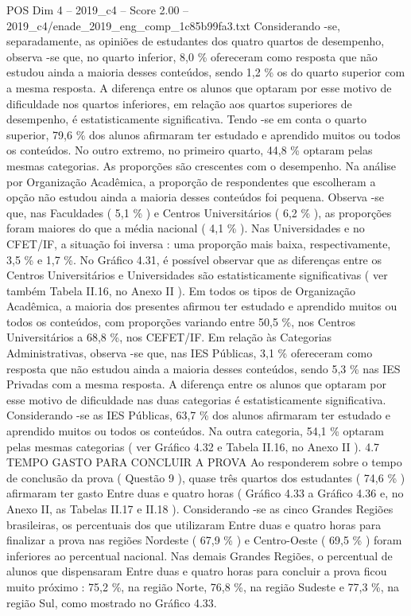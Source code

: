 \begin{textsample}{POS Dim 4 – 2019\_c4 – Score 2.00 – 2019\_c4/enade\_2019\_eng\_comp\_1c85b99fa3.txt}
Considerando -se, separadamente, as opiniões de estudantes dos quatro quartos de desempenho, observa -se que, no quarto inferior, 8,0 \% ofereceram como resposta que não estudou ainda a maioria desses conteúdos, sendo 1,2 \% os do quarto superior com a mesma resposta.
A diferença entre os alunos que optaram por esse motivo de dificuldade nos quartos inferiores, em relação aos quartos superiores de desempenho, é estatisticamente significativa.
Tendo -se em conta o quarto superior, 79,6 \% dos alunos afirmaram ter estudado e aprendido muitos ou todos os conteúdos.
No outro extremo, no primeiro quarto, 44,8 \% optaram pelas mesmas categorias.
As proporções são crescentes com o desempenho.
Na análise por Organização Acadêmica, a proporção de respondentes que escolheram a opção não estudou ainda a maioria desses conteúdos foi pequena.
Observa -se que, nas Faculdades ( 5,1 \% ) e Centros Universitários ( 6,2 \% ), as proporções foram maiores do que a média nacional ( 4,1 \% ).
Nas Universidades e no CFET/IF, a situação foi inversa : uma proporção mais baixa, respectivamente, 3,5 \% e 1,7 \%.
No Gráfico 4.31, é possível observar que as diferenças entre os Centros Universitários e Universidades são estatisticamente significativas ( ver também Tabela II.16, no Anexo II ).
Em todos os tipos de Organização Acadêmica, a maioria dos presentes afirmou ter estudado e aprendido muitos ou todos os conteúdos, com proporções variando entre 50,5 \%, nos Centros Universitários a 68,8 \%, nos CEFET/IF.
Em relação às Categorias Administrativas, observa -se que, nas IES Públicas, 3,1 \% ofereceram como resposta que não estudou ainda a maioria desses conteúdos, sendo 5,3 \% nas IES Privadas com a mesma resposta.
A diferença entre os alunos que optaram por esse motivo de dificuldade nas duas categorias é estatisticamente significativa.
Considerando -se as IES Públicas, 63,7 \% dos alunos afirmaram ter estudado e aprendido muitos ou todos os conteúdos.
Na outra categoria, 54,1 \% optaram pelas mesmas categorias ( ver Gráfico 4.32 e Tabela II.16, no Anexo II ). 4.7 TEMPO GASTO PARA CONCLUIR A PROVA Ao responderem sobre o tempo de conclusão da prova ( Questão 9 ), quase três quartos dos estudantes ( 74,6 \% ) afirmaram ter gasto Entre duas e quatro horas ( Gráfico 4.33 a Gráfico 4.36 e, no Anexo II, as Tabelas II.17 e II.18 ).
Considerando -se as cinco Grandes Regiões brasileiras, os percentuais dos que utilizaram Entre duas e quatro horas para finalizar a prova nas regiões Nordeste ( 67,9 \% ) e Centro-Oeste ( 69,5 \% ) foram inferiores ao percentual nacional.
Nas demais Grandes Regiões, o percentual de alunos que dispensaram Entre duas e quatro horas para concluir a prova ficou muito próximo : 75,2 \%, na região Norte, 76,8 \%, na região Sudeste e 77,3 \%, na região Sul, como mostrado no Gráfico 4.33.

\end{textsample}
